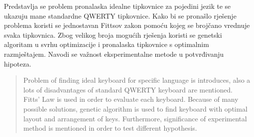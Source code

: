\documentclass[times, utf8, zavrsni, numeric]{fer}
\begin{document}
\clearpage

\begin{sazetak}
Predstavlja se problem pronalaska idealne tipkovnice za pojedini jezik te se ukazuju mane standardne QWERTY tipkovnice. Kako bi se pronašlo rješenje problema koristi se jednostavan Fittsov zakon pomoću kojeg se brojčano vrednuje svaka tipkovnica. Zbog velikog broja mogućih rješenja koristi se genetski algoritam u svrhu optimizacije i pronalaska tipkovnice s optimalnim razmještajem. Navodi se važnost eksperimentalne metode u potvrđivanju hipoteza.

\end{sazetak}

\begin{abstract}
Problem of finding ideal keyboard for specific language is introduces, also a lots of disadvantages of standard QWERTY keyboard are mentioned. Fitts' Law is used in order to evaluate each keyboard. Because of many possible solutions, genetic algorithm is used to find keyboard with optimal layout and arrangement of keys. Furthermore, significance of experimental method is mentioned in order to test different hypothesis.

\end{abstract}
\end{document}
